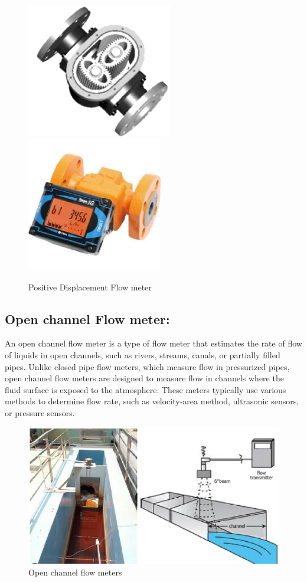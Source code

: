 \begin{figure}[h!]
    \centering
    \includegraphics[width=2.50105in,height=2.32in]{figs/flowmeters/image20.png}
    \includegraphics[width=2.33107in,height=2.32in]{figs/flowmeters/image21.png}
    \caption{Positive Displacement Flow meter}
    \label{fig:Positive Displacement Flow meter}
\end{figure}

\subsection{Open channel Flow meter:}

An open channel flow meter is a type of flow meter that estimates the
rate of flow of liquids in open channels, such as rivers, streams,
canals, or partially filled pipes. Unlike closed pipe flow meters, which
measure flow in pressurized pipes, open channel flow meters are designed
to measure flow in channels where the fluid surface is exposed to the
atmosphere. These meters typically use various methods to determine flow
rate, such as velocity-area method, ultrasonic sensors, or pressure
sensors.


\begin{figure}[h!]
    \centering
    \includegraphics[width=0.7\linewidth]{figs/flowmeters/image22.png}
    \caption{Open channel flow meters}
    \label{fig:Open channel flow meters}
\end{figure}




